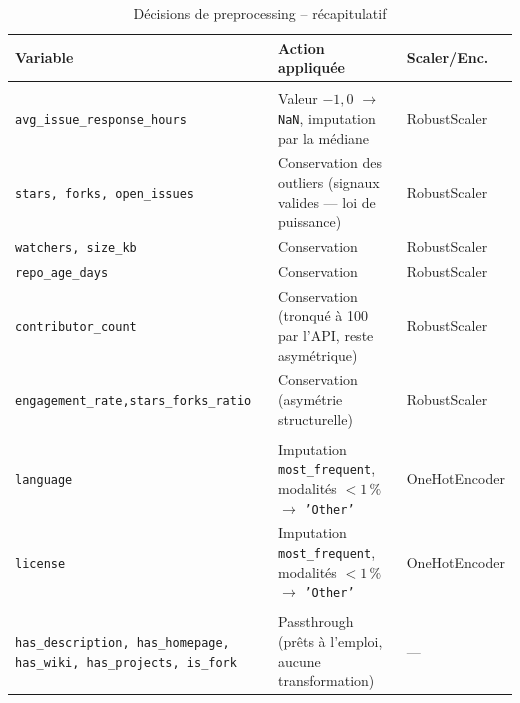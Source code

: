 \documentclass[12pt,a4paper]{article}
\begin{document}
\begin{table}[H]
  \centering
  \caption{Décisions de preprocessing -- récapitulatif}
  \label{tab:preprocessing}
  \small
  \begin{tabularx}{\linewidth}{P{4.2cm}Ll}
    \toprule
    \textbf{Variable} & \textbf{Action appliquée} & \textbf{Scaler/Enc.} \\
    \midrule
     \\
    \texttt{avg\_issue\_response\_hours} &
      Valeur $-1{,}0$ $\to$ \texttt{NaN}, imputation par la médiane &
      RobustScaler \\
    \texttt{stars, forks, open\_issues} &
      Conservation des outliers (signaux valides --- loi de puissance) &
      RobustScaler \\
    \texttt{watchers, size\_kb} &
      Conservation &
      RobustScaler \\
    \texttt{repo\_age\_days} &
      Conservation &
      RobustScaler \\
    \texttt{contributor\_count} &
      Conservation (tronqué à 100 par l'API, reste asymétrique) &
      RobustScaler \\
    \texttt{engagement\_rate,}\newline\texttt{stars\_forks\_ratio} &
      Conservation (asymétrie structurelle) &
      RobustScaler \\
    \midrule
     \\
    \texttt{language} &
      Imputation \texttt{most\_frequent}, modalités $<1\,\%$ $\to$ \texttt{'Other'} &
      OneHotEncoder \\
    \texttt{license} &
      Imputation \texttt{most\_frequent}, modalités $<1\,\%$ $\to$ \texttt{'Other'} &
      OneHotEncoder \\
    \midrule
     \\
    \texttt{has\_description, has\_homepage,}\newline
    \texttt{has\_wiki, has\_projects, is\_fork} &
      Passthrough (prêts à l'emploi, aucune transformation) &
      --- \\
    \bottomrule
  \end{tabularx}
\end{table}
\end{document}
